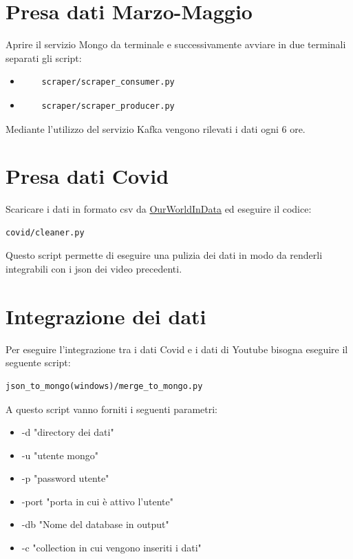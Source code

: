 \documentclass[10pt, a4paper,openany]{article}
\begin{document}
\section*{Presa dati Marzo-Maggio}

Aprire il servizio Mongo da terminale e successivamente avviare in due terminali separati gli script:

\begin{itemize}
	\item \begin{verbatim}
	scraper/scraper_consumer.py
	\end{verbatim}
	\item \begin{verbatim}
	scraper/scraper_producer.py
	\end{verbatim}
\end{itemize}

Mediante l'utilizzo del servizio Kafka vengono rilevati i dati ogni 6 ore.

\section*{Presa dati Covid}

Scaricare i dati in formato csv da \href{https://ourworldindata.org/coronavirus-testing}{OurWorldInData}
ed eseguire il codice:

\begin{verbatim}
covid/cleaner.py
\end{verbatim}

Questo script permette di eseguire una pulizia dei dati in modo da renderli integrabili con i json dei video precedenti.

\section*{Integrazione dei dati}


Per eseguire l'integrazione tra i dati Covid e i dati di Youtube bisogna eseguire il seguente script:

\begin{verbatim}
json_to_mongo(windows)/merge_to_mongo.py
\end{verbatim}

A questo script vanno forniti i seguenti parametri:

\begin{itemize}
	\item -d "directory dei dati"
	\item -u "utente mongo"
	\item -p "password utente"
	\item -port "porta in cui è attivo l'utente"
	\item-db "Nome del database in output"
	\item -c "collection in cui vengono inseriti i dati"
\end{itemize}
\end{document}
